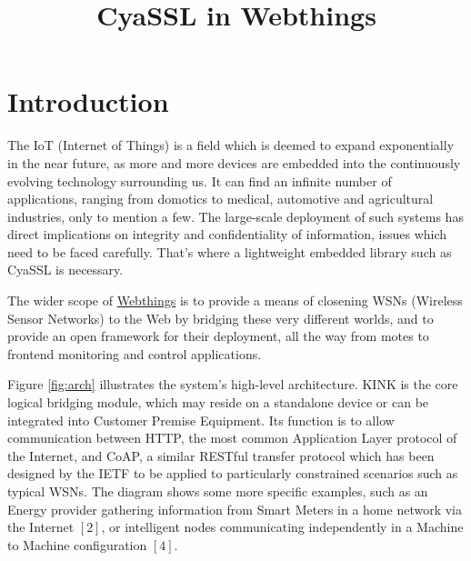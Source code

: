 \documentclass[10pt]{article}
\title{\textbf{CyaSSL in Webthings}}
\author{}
\date{}
\begin{document}
\maketitle

\section{Introduction}

The IoT (Internet of Things) is a field which is deemed to expand exponentially in the near future, as more and more devices are embedded into the continuously evolving technology surrounding us. It can find an infinite number of applications, ranging from domotics to medical, automotive and agricultural industries, only to mention a few. The large-scale deployment of such systems has direct implications on integrity and confidentiality of information, issues which need to be faced carefully. That's where a lightweight embedded library such as CyaSSL is necessary.

The wider scope of \href{http://github.com/koanlogic/webthings}{Webthings} is to provide a means of closening WSNs (Wireless Sensor Networks) to the Web by bridging these very different worlds, and to provide an open framework for their deployment, all the way from motes to frontend monitoring and control applications.

Figure \ref{fig:arch} illustrates the system's high-level architecture. KINK is the core logical bridging module, which may reside on a standalone device or can be integrated into Customer Premise Equipment. Its function is to allow communication between HTTP, the most common Application Layer protocol of the Internet, and CoAP, a similar RESTful transfer protocol which has been designed by the IETF to be applied to particularly constrained scenarios such as typical WSNs. 
The diagram shows some more specific examples, such as an Energy provider gathering information from Smart Meters in a home network via the Internet $[2]$, or intelligent nodes communicating independently in a Machine to Machine configuration $[4]$.
\end{document}
